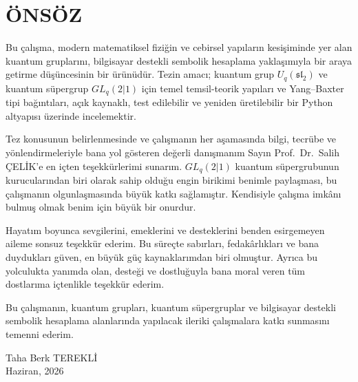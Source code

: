 \documentclass[12pt,a4paper,fleqn]{report}
\newcommand{\normalsemi}{;}
\newcommand{\normalsemi}{\begingroup\semicolonfont;\endgroup}
\numberwithin{equation}{chapter}
\renewcommand{\contentsname}{İÇİNDEKİLER}%
\theoremstyle{plain}
\theoremstyle{definition}
\renewcommand{\sl}{\mathfrak{sl}}
\newcommand{\Uq}{U_q(\sl_2)}
\newcommand{\Ogrenci}{Taha Berk TEREKLİ}
\newcommand{\Danisman}{Prof.\ Dr.\ Salih ÇELİK}
\newcommand{\TarihAy}{Haziran}
\newcommand{\TarihYil}{2026}
\begin{document}
\thispagestyle{empty} %
\chapter*{ÖNSÖZ}

Bu çalışma, modern matematiksel fiziğin ve cebirsel yapıların kesişiminde yer alan
kuantum gruplarını, bilgisayar destekli sembolik hesaplama yaklaşımıyla bir araya
getirme düşüncesinin bir ürünüdür. Tezin amacı\normalsemi{} kuantum grup $\Uq$ ve kuantum
süpergrup $GL_q(2|1)$ için temel temsil-teorik yapıları ve Yang--Baxter tipi
bağıntıları, açık kaynaklı, test edilebilir ve yeniden üretilebilir bir Python
altyapısı üzerinde incelemektir.

Tez konusunun belirlenmesinde ve çalışmanın her aşamasında bilgi, tecrübe ve
yönlendirmeleriyle bana yol gösteren değerli danışmanım Sayın \Danisman'e en içten
teşekkürlerimi sunarım. $GL_q(2|1)$ kuantum süpergrubunun kurucularından biri olarak
sahip olduğu engin birikimi benimle paylaşması, bu çalışmanın olgunlaşmasında büyük
katkı sağlamıştır. Kendisiyle çalışma imkânı bulmuş olmak benim için büyük bir
onurdur.

Hayatım boyunca sevgilerini, emeklerini ve desteklerini benden esirgemeyen aileme
sonsuz teşekkür ederim. Bu süreçte sabırları, fedakârlıkları ve bana duydukları
güven, en büyük güç kaynaklarımdan biri olmuştur. Ayrıca bu yolculukta yanımda olan,
desteği ve dostluğuyla bana moral veren tüm dostlarıma içtenlikle teşekkür ederim.

Bu çalışmanın, kuantum grupları, kuantum süpergruplar ve bilgisayar destekli sembolik
hesaplama alanlarında yapılacak ileriki çalışmalara katkı sunmasını temenni ederim.

\vspace{1.5cm}
\begin{flushright}
\Ogrenci\\
\TarihAy, \TarihYil
\end{flushright}
\clearpage

\renewcommand{\contentsname}{İÇİNDEKİLER}
\tableofcontents
\clearpage

\end{document}
